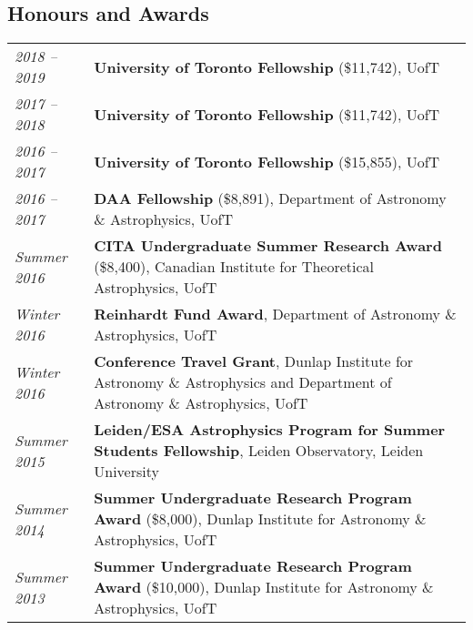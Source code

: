 \documentclass[10pt]{res} %
\begin{document}
\begin{resume}

\section{\Large Honours and Awards}
\vspace{-5pt} %
\noindent\makebox[\linewidth]{\rule{\textwidth}{0.4pt}}
\vspace{-20pt} %

\begin{table}[h]
\begin{tabularx}{\textwidth}{lX}
\textit{2018 -- 2019} & \textbf{University of Toronto Fellowship} (\$11,742), UofT \\
\textit{2017 -- 2018} & \textbf{University of Toronto Fellowship} (\$11,742), UofT \\
\textit{2016 -- 2017} & \textbf{University of Toronto Fellowship} (\$15,855), UofT \\
\textit{2016 -- 2017} & \textbf{DAA Fellowship} (\$8,891), Department of Astronomy \& Astrophysics, UofT \\
\textit{Summer 2016} & \textbf{CITA Undergraduate Summer Research Award} (\$8,400), Canadian Institute for Theoretical Astrophysics, UofT \\
\textit{Winter 2016} & \textbf{Reinhardt Fund Award}, Department of Astronomy \& Astrophysics, UofT \\
\textit{Winter 2016} & \textbf{Conference Travel Grant}, Dunlap Institute for Astronomy \& Astrophysics and Department of Astronomy \& Astrophysics, UofT \\
\textit{Summer 2015} & \textbf{Leiden/ESA Astrophysics Program for Summer Students Fellowship}, Leiden Observatory, Leiden University \\
\textit{Summer 2014} & \textbf{Summer Undergraduate Research Program Award} (\$8,000), Dunlap Institute for Astronomy \& Astrophysics, UofT \\
\textit{Summer 2013} & \textbf{Summer Undergraduate Research Program Award} (\$10,000), Dunlap Institute for Astronomy \& Astrophysics, UofT 
\end{tabularx}
\end{table}


\end{resume}
\end{document}
